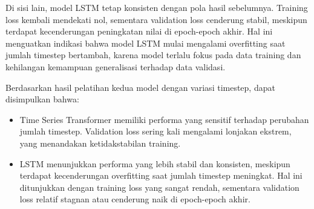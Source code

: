 Di sisi lain, model LSTM tetap konsisten dengan pola hasil sebelumnya. Training loss kembali mendekati nol, sementara validation loss cenderung stabil, meskipun terdapat kecenderungan peningkatan nilai di epoch-epoch akhir. Hal ini menguatkan indikasi bahwa model LSTM mulai mengalami overfitting saat jumlah timestep bertambah, karena model terlalu fokus pada data training dan kehilangan kemampuan generalisasi terhadap data validasi.

Berdasarkan hasil pelatihan kedua model dengan variasi timestep, dapat disimpulkan bahwa:
\begin{itemize}
    \item Time Series Transformer memiliki performa yang sensitif terhadap perubahan jumlah timestep. Validation loss sering kali mengalami lonjakan ekstrem, yang menandakan ketidakstabilan training.

    \item LSTM menunjukkan performa yang lebih stabil dan konsisten, meskipun terdapat kecenderungan overfitting saat jumlah timestep meningkat. Hal ini ditunjukkan dengan training loss yang sangat rendah, sementara validation loss relatif stagnan atau cenderung naik di epoch-epoch akhir.

\end{itemize}

